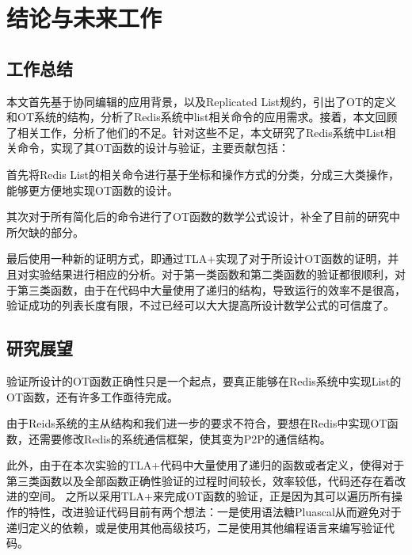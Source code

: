 \chapter{结论与未来工作}
\label{chapter:conclusion_future_work}
\section{工作总结}
\par 本文首先基于协同编辑的应用背景，以及Replicated List规约，引出了OT的定义和OT系统的结构，分析了Redis系统中list相关命令的应用需求。接着，本文回顾了相关工作，分析了他们的不足。针对这些不足，本文研究了Redis系统中List相关命令，实现了其OT函数的设计与验证，主要贡献包括：
\par 首先将Redis List的相关命令进行基于坐标和操作方式的分类，分成三大类操作，能够更方便地实现OT函数的设计。
\par 其次对于所有简化后的命令进行了OT函数的数学公式设计，补全了目前的研究中所欠缺的部分。
\par 最后使用一种新的证明方式，即通过TLA+实现了对于所设计OT函数的证明，并且对实验结果进行相应的分析。对于第一类函数和第二类函数的验证都很顺利，对于第三类函数，由于在代码中大量使用了递归的结构，导致运行的效率不是很高，验证成功的列表长度有限，不过已经可以大大提高所设计数学公式的可信度了。
\section{研究展望}
验证所设计的OT函数正确性只是一个起点，要真正能够在Redis系统中实现List的OT函数，还有许多工作亟待完成。

由于Reids系统的主从结构和我们进一步的要求不符合，要想在Redis中实现OT函数，还需要修改Redis的系统通信框架，使其变为P2P的通信结构。

此外，由于在本次实验的TLA+代码中大量使用了递归的函数或者定义，使得对于第三类函数以及全部函数正确性验证的过程时间较长，效率较低，代码还存在着改进的空间。
之所以采用TLA+来完成OT函数的验证，正是因为其可以遍历所有操作的特性，改进验证代码目前有两个想法：一是使用语法糖Pluascal从而避免对于递归定义的依赖，或是使用其他高级技巧，二是使用其他编程语言来编写验证代码。
